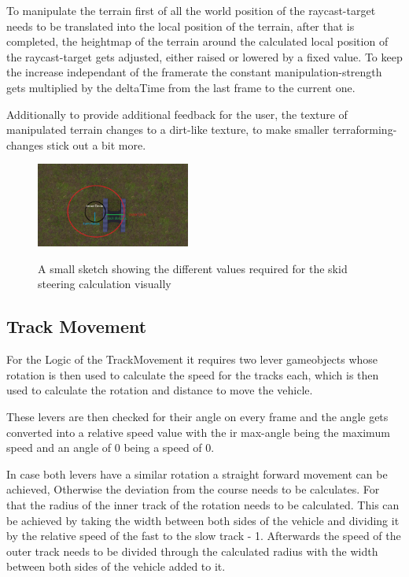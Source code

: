\documentclass[journal]{vgtc}                     %
\begin{document}
To manipulate the terrain first of all the world position of the raycast-target needs to be translated into the local position of the terrain, after that is completed, the heightmap of the terrain around the calculated local position of the raycast-target gets adjusted, either raised or lowered by a fixed value. To keep the increase independant of the framerate the constant manipulation-strength gets multiplied by the deltaTime from the last frame to the current one.

Additionally to provide additional feedback for the user, the texture of manipulated terrain changes to a dirt-like texture, to make smaller terraforming-changes stick out a bit more.

\begin{figure}[h]%
  \centering %
  \includegraphics[width=0.45\textwidth, alt={A Top-Down View of the track-base of the excavator with a few circles and radius showing the different values required for calculating the skid steering rotation}]{TrackBase}
  \caption{%
  	A small sketch showing the different values required for the skid steering calculation visually%
  }
  \label{fig:skid_steering_sketch}
\end{figure}
\subsection{Track Movement}

For the Logic of the TrackMovement it requires two lever gameobjects whose rotation is then used to calculate the speed for the tracks each, which is then used to calculate the rotation and distance to move the vehicle.

These levers are then checked for their angle on every frame and the angle gets converted into a relative speed value with the ir max-angle being the maximum speed and an angle of 0 being a speed of 0.

In case both levers have a similar rotation a straight forward movement can be achieved, Otherwise the deviation from the course needs to be calculates. For that the radius of the inner track of the rotation needs to be calculated. This can be achieved by taking the width between both sides of the vehicle and dividing it by the relative speed of the fast to the slow track - 1. Afterwards the speed of the outer track needs to be divided through the calculated radius with the width between both sides of the vehicle added to it.
\end{document}
